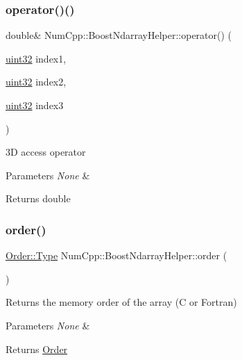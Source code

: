 \subsubsection{\texorpdfstring{operator()()}{operator()()}\hspace{0.1cm}{\footnotesize\ttfamily [3/3]}}
{\footnotesize\ttfamily double\& Num\+Cpp\+::\+Boost\+Ndarray\+Helper\+::operator() (\begin{DoxyParamCaption}\item[{\mbox{\hyperlink{namespace_num_cpp_a36f388e948380413c63011cab9b7fbd5}{uint32}}}]{index1,  }\item[{\mbox{\hyperlink{namespace_num_cpp_a36f388e948380413c63011cab9b7fbd5}{uint32}}}]{index2,  }\item[{\mbox{\hyperlink{namespace_num_cpp_a36f388e948380413c63011cab9b7fbd5}{uint32}}}]{index3 }\end{DoxyParamCaption})\hspace{0.3cm}{\ttfamily [inline]}}

3D access operator


\begin{DoxyParams}{Parameters}
{\em None} & \\
\hline
\end{DoxyParams}
\begin{DoxyReturn}{Returns}
double 
\end{DoxyReturn}
\mbox{\label{class_num_cpp_1_1_boost_ndarray_helper_a5235f3230a1baee3e8e9b1184ef10238}} 
\subsubsection{\texorpdfstring{order()}{order()}}
{\footnotesize\ttfamily \mbox{\hyperlink{struct_num_cpp_1_1_order_a1ec7189cd22800f34d163dec75732c7f}{Order\+::\+Type}} Num\+Cpp\+::\+Boost\+Ndarray\+Helper\+::order (\begin{DoxyParamCaption}{ }\end{DoxyParamCaption})\hspace{0.3cm}{\ttfamily [inline]}}

Returns the memory order of the array (C or Fortran)


\begin{DoxyParams}{Parameters}
{\em None} & \\
\hline
\end{DoxyParams}
\begin{DoxyReturn}{Returns}
\mbox{\hyperlink{struct_num_cpp_1_1_order}{Order}} 
\end{DoxyReturn}
\mbox{\label{class_num_cpp_1_1_boost_ndarray_helper_a80575e5d0dcdb4c9f7448c8f08b463b2}} 

